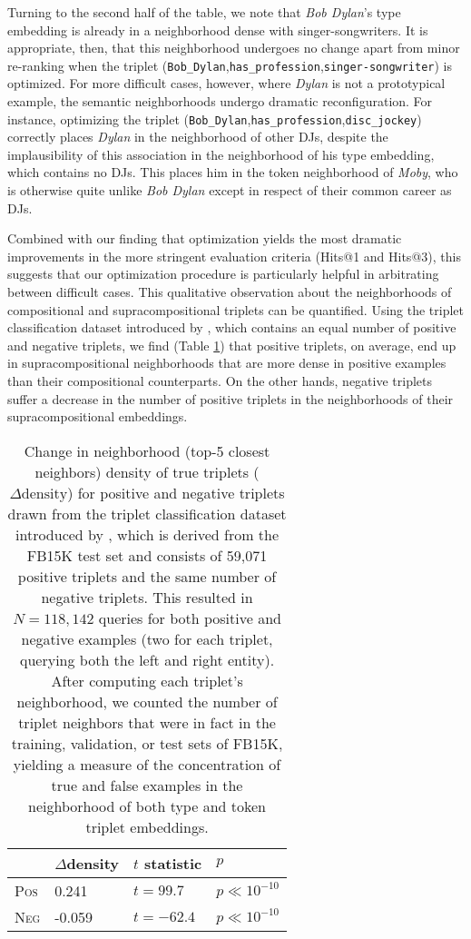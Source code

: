\documentclass[a4paper,10pt]{article}
\begin{document}
Turning to the second half of the table, we note that \emph{Bob Dylan}'s type embedding is already in a neighborhood dense with singer-songwriters. It is appropriate, then, that this neighborhood undergoes no change apart from minor re-ranking when the triplet (\texttt{Bob\_{}Dylan},\texttt{has\_{}profession},\texttt{singer-songwriter}) is optimized. For more difficult cases, however, where \emph{Dylan} is not a prototypical example, the semantic neighborhoods undergo dramatic reconfiguration. For instance, optimizing the triplet (\texttt{Bob\_{}Dylan},\texttt{has\_{}profession},\texttt{disc\_{}jockey}) correctly places \emph{Dylan} in the neighborhood of other DJs, despite the implausibility of this association in the neighborhood of his type embedding, which contains no DJs. This places him in the token neighborhood of \emph{Moby}, who is otherwise quite unlike \emph{Bob Dylan} except in respect of their common career as DJs. 

Combined with our finding that optimization yields the most dramatic improvements in the more stringent evaluation criteria (Hits@1 and Hits@3), this suggests that our optimization procedure is particularly helpful in arbitrating between difficult cases. This qualitative observation about the neighborhoods of compositional and supracompositional triplets can be quantified. Using the triplet classification dataset introduced by \citet{socher2013neuraltensor}, which contains an equal number of positive and negative triplets, we find (Table \ref{table_neighborhood_results}) that positive triplets, on average, end up in supracompositional neighborhoods that are more dense in positive examples than their compositional counterparts. On the other hands, negative triplets suffer a decrease in the number of positive triplets in the neighborhoods of their supracompositional embeddings. 
\begin{table}
\begin{center}
\begin{tabular}{|l|l|l|l|} \hline
	&	$\Delta$density & $t$ statistic & $p$ \\\hline
\textsc{Pos} 	& 0.241	& $t=99.7$ & $p \ll 10^{-10}$\\
\textsc{Neg}	& -0.059 & $t=-62.4$ & $p \ll 10^{-10}$ \\\hline
\end{tabular} \end{center}
\caption{Change in neighborhood (top-5 closest neighbors) density of true triplets ($\Delta\text{density}$) for positive and negative triplets drawn from the triplet classification dataset introduced by \citet{socher2013neuraltensor}, which is derived from the FB15K test set and consists of 59,071 positive triplets and the same number of negative triplets. This resulted in $N=118,142$ queries for both positive and negative examples (two for each triplet, querying both the left and right entity). After computing each triplet's neighborhood, we counted the number of triplet neighbors that were in fact in the training, validation, or test sets of FB15K, yielding a measure of the concentration of true and false examples in the neighborhood of both type and token triplet embeddings. } \label{table_neighborhood_results}
\end{table} 
\end{document}
